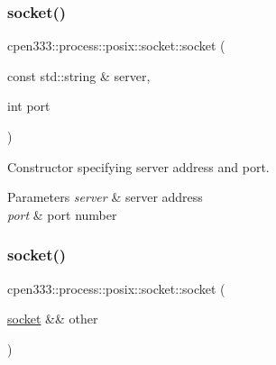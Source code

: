 \mbox{\label{classcpen333_1_1process_1_1posix_1_1socket_a0cb25f1ab47ee533f8c5a9b8968357bd}} 
\subsubsection{\texorpdfstring{socket()}{socket()}\hspace{0.1cm}{\footnotesize\ttfamily [2/3]}}
{\footnotesize\ttfamily cpen333\+::process\+::posix\+::socket\+::socket (\begin{DoxyParamCaption}\item[{const std\+::string \&}]{server,  }\item[{int}]{port }\end{DoxyParamCaption})\hspace{0.3cm}{\ttfamily [inline]}}



Constructor specifying server address and port. 


\begin{DoxyParams}{Parameters}
{\em server} & server address \\
\hline
{\em port} & port number \\
\hline
\end{DoxyParams}
\mbox{\label{classcpen333_1_1process_1_1posix_1_1socket_a8c0d036039c11145cc0b342b4006a0aa}} 
\subsubsection{\texorpdfstring{socket()}{socket()}\hspace{0.1cm}{\footnotesize\ttfamily [3/3]}}
{\footnotesize\ttfamily cpen333\+::process\+::posix\+::socket\+::socket (\begin{DoxyParamCaption}\item[{\hyperlink{classcpen333_1_1process_1_1posix_1_1socket}{socket} \&\&}]{other }\end{DoxyParamCaption})\hspace{0.3cm}{\ttfamily [inline]}}



